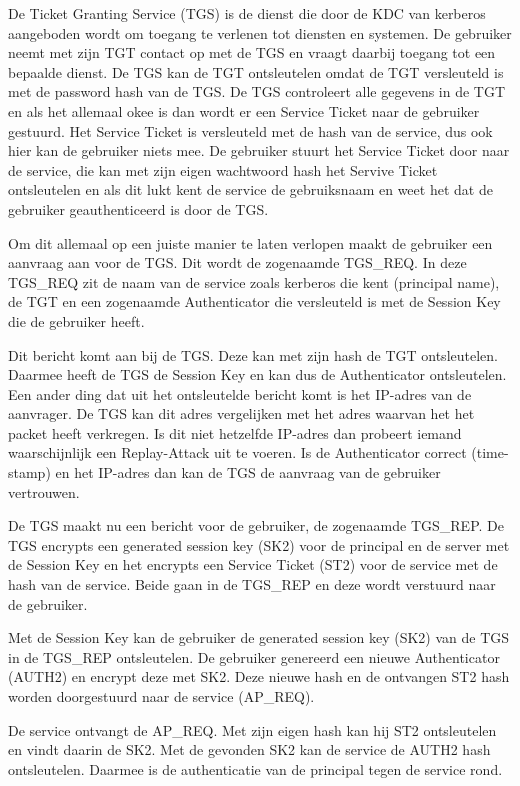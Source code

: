 De Ticket Granting Service (TGS) is de dienst die door de KDC van kerberos aangeboden wordt om toegang te verlenen tot diensten en systemen. De gebruiker neemt met zijn TGT contact op met de TGS en vraagt daarbij toegang tot een bepaalde dienst. De TGS kan de TGT ontsleutelen omdat de TGT versleuteld is met de password hash van de TGS. De TGS controleert alle gegevens in de TGT en als het allemaal okee is dan wordt er een Service Ticket naar de gebruiker gestuurd. Het Service Ticket is versleuteld met de hash van de service, dus ook hier kan de gebruiker niets mee. De gebruiker stuurt het Service Ticket door naar de service, die kan met zijn eigen wachtwoord hash het Servive Ticket ontsleutelen en als dit lukt kent de service de gebruiksnaam en weet het dat de gebruiker geauthenticeerd is door de TGS.

Om dit allemaal op een juiste manier te laten verlopen maakt de gebruiker een aanvraag aan voor de TGS. Dit wordt de zogenaamde TGS\_REQ. In deze TGS\_REQ zit de naam van de service zoals kerberos die kent (principal name), de TGT en een zogenaamde Authenticator die versleuteld is met de Session Key die de gebruiker heeft.

Dit bericht komt aan bij de TGS. Deze kan met zijn hash de TGT ontsleutelen. Daarmee heeft de TGS de Session Key en kan dus de Authenticator ontsleutelen. Een ander ding dat uit het ontsleutelde bericht komt is het IP-adres van de aanvrager. De TGS kan dit adres vergelijken met het adres waarvan het het packet heeft verkregen. Is dit niet hetzelfde IP-adres dan probeert iemand waarschijnlijk een Replay-Attack uit te voeren. Is de Authenticator correct (time-stamp) en het IP-adres dan kan de TGS de aanvraag van de gebruiker vertrouwen.

De TGS maakt nu een bericht voor de gebruiker, de zogenaamde TGS\_REP. De TGS encrypts een generated session key (SK2) voor de principal en de server met de Session Key en het encrypts een Service Ticket (ST2) voor de service met de hash van de service. Beide gaan in de TGS\_REP en deze wordt verstuurd naar de gebruiker.

Met de Session Key kan de gebruiker de generated session key (SK2) van de TGS in de TGS\_REP ontsleutelen. De gebruiker genereerd een nieuwe Authenticator (AUTH2) en encrypt deze met SK2. Deze nieuwe hash en de ontvangen ST2 hash worden doorgestuurd naar de service (AP\_REQ).

De service ontvangt de AP\_REQ. Met zijn eigen hash kan hij ST2 ontsleutelen en vindt daarin de SK2. Met de gevonden SK2 kan de service de AUTH2 hash ontsleutelen. Daarmee is de authenticatie van de principal tegen de service rond.


